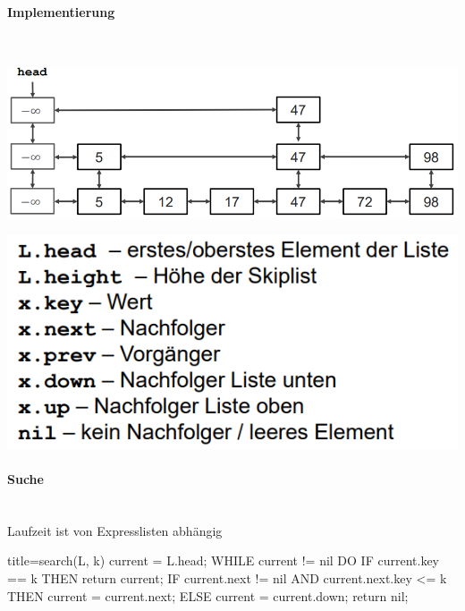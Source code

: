\documentclass[
    ngerman,
    color=3b,
    load_common, %
    summary,
    boxarc,
]{tuda_summary}
\begin{document}
\paragraph{Implementierung}\mbox{}\\
\begin{minipage}{.60\textwidth-2.22166pt}
    \centering
    \includegraphics[width=\textwidth]{pictures/skiplistImplement1.PNG}\\
\end{minipage}
\begin{minipage}{.4\textwidth}
    \centering
    \includegraphics[width=\textwidth]{pictures/skiplistImplement2.PNG}
\end{minipage}

\clearpage
\paragraph{Suche}\mbox{}\\
Laufzeit ist von Expresslisten abhängig
\begin{codeBlock}[autogobble]{title={search(L, k)}}
current = L.head;
WHILE current != nil DO
    IF current.key == k THEN 
        return current;
    IF current.next != nil AND current.next.key <= k THEN
        current = current.next;
    ELSE
        current = current.down;
return nil;
\end{codeBlock}
\end{document}
